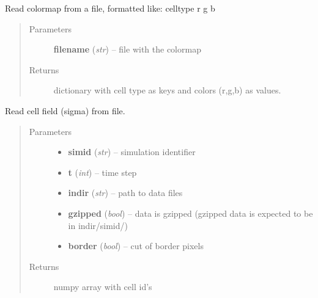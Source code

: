 \documentclass[letterpaper,10pt,english]{sphinxmanual}
\begin{document}
\begin{fulllineitems}
\label{Readers:Readers.readColorMap}
Read colormap from a file, formatted like: celltype r g b
\begin{quote}\begin{description}
\item[{Parameters}] \leavevmode
\textbf{filename} (\emph{str}) -- file with the colormap

\item[{Returns}] \leavevmode
dictionary with cell type as keys and colors (r,g,b) as values.

\end{description}\end{quote}

\end{fulllineitems}


\begin{fulllineitems}
\label{Readers:Readers.readSigma}
Read cell field (sigma) from file.
\begin{quote}\begin{description}
\item[{Parameters}] \leavevmode\begin{itemize}
\item {} 
\textbf{simid} (\emph{str}) -- simulation identifier

\item {} 
\textbf{t} (\emph{int}) -- time step

\item {} 
\textbf{indir} (\emph{str}) -- path to data files

\item {} 
\textbf{gzipped} (\emph{bool}) -- data is gzipped (gzipped data is expected to be in indir/simid/)

\item {} 
\textbf{border} (\emph{bool}) -- cut of border pixels

\end{itemize}

\item[{Returns}] \leavevmode
numpy array with cell id's

\end{description}\end{quote}

\end{fulllineitems}
\end{document}
